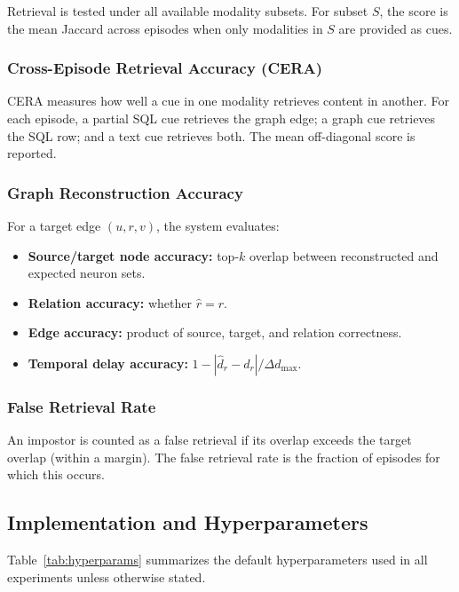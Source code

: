 Retrieval is tested under all available modality subsets. For subset $S$, the score is the mean Jaccard across episodes when only modalities in $S$ are provided as cues.

\subsubsection{Cross-Episode Retrieval Accuracy (CERA)}

CERA measures how well a cue in one modality retrieves content in another. For each episode, a partial SQL cue retrieves the graph edge; a graph cue retrieves the SQL row; and a text cue retrieves both. The mean off-diagonal score is reported.

\subsubsection{Graph Reconstruction Accuracy}

For a target edge $(u, r, v)$, the system evaluates:
\begin{itemize}
    \item \textbf{Source/target node accuracy:} top-$k$ overlap between reconstructed and expected neuron sets.
    \item \textbf{Relation accuracy:} whether $\hat{r} = r$.
    \item \textbf{Edge accuracy:} product of source, target, and relation correctness.
    \item \textbf{Temporal delay accuracy:} $1 - |\hat{d}_r - d_r| / \Delta d_{\max}$.
\end{itemize}

\subsubsection{False Retrieval Rate}

An impostor is counted as a false retrieval if its overlap exceeds the target overlap (within a margin). The false retrieval rate is the fraction of episodes for which this occurs.


\subsection{Implementation and Hyperparameters}
\label{sec:hyperparams}

Table~\ref{tab:hyperparams} summarizes the default hyperparameters used in all experiments unless otherwise stated.

